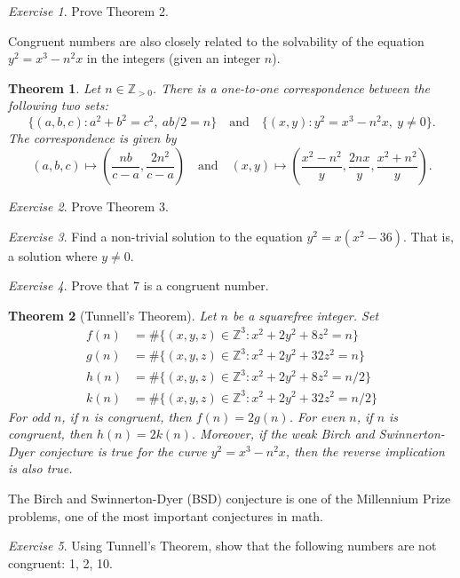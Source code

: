 \documentclass{article}
\newtheorem{theorem}{Theorem}%
\theoremstyle{definition}
\theoremstyle{remark}
\newtheorem{exercise}{Exercise}
\newcommand{\ZZ}{\mathbb{Z}}
\begin{document}
\begin{exercise}
	Prove Theorem 2.
\end{exercise}

Congruent numbers are also closely related to the solvability of the equation \(y^2=x^3-n^2x\) in the integers (given an integer \(n\)).

\begin{theorem}
	Let \(n\in\ZZ_{>0}\).
	There is a one-to-one correspondence between the following two sets:
	\[\{(a,b,c):a^2+b^2=c^2,\ ab/2=n\}\quad\text{and}\quad\{(x,y):y^2=x^3-n^2x,\ y\neq 0\}.\]
	The correspondence is given by 
	\[(a,b,c)\longmapsto\left(\frac{nb}{c-a},\frac{2n^2}{c-a}\right)\quad\text{and}\quad(x,y)\mapsto\left(\frac{x^2-n^2}{y},\frac{2nx}{y},\frac{x^2+n^2}{y}\right).\]
\end{theorem}

\begin{exercise}
	Prove Theorem 3.
\end{exercise}

\begin{exercise}
	Find a non-trivial solution to the equation \(y^2=x(x^2-36)\).
	That is, a solution where \(y\neq 0\).
\end{exercise}

\begin{exercise}
	Prove that \(7\) is a congruent number.
\end{exercise}

\begin{theorem}[Tunnell's Theorem]
	Let \(n\) be a squarefree integer.
	Set
	\begin{align*}
		f(n) &= \#\{(x,y,z)\in\ZZ^3:x^2+2y^2+8z^2=n\}\\
		g(n) &= \#\{(x,y,z)\in\ZZ^3:x^2+2y^2+32z^2=n\}\\
		h(n) &= \#\{(x,y,z)\in\ZZ^3:x^2+2y^2+8z^2=n/2\}\\
		k(n) &= \#\{(x,y,z)\in\ZZ^3:x^2+2y^2+32z^2=n/2\}
	\end{align*}
	For odd \(n\), if \(n\) is congruent, then \(f(n)=2g(n)\).
	For even \(n\), if \(n\) is congruent, then \(h(n)=2k(n)\).
	Moreover, if the weak Birch and Swinnerton-Dyer conjecture is true for the curve \(y^2=x^3-n^2x\), then the reverse implication is also true.
\end{theorem}

The Birch and Swinnerton-Dyer (BSD) conjecture is one of the Millennium Prize problems, one of the most important conjectures in math.

\begin{exercise}
	Using Tunnell's Theorem, show that the following numbers are not congruent: 1, 2, 10.
\end{exercise}
\end{document}
